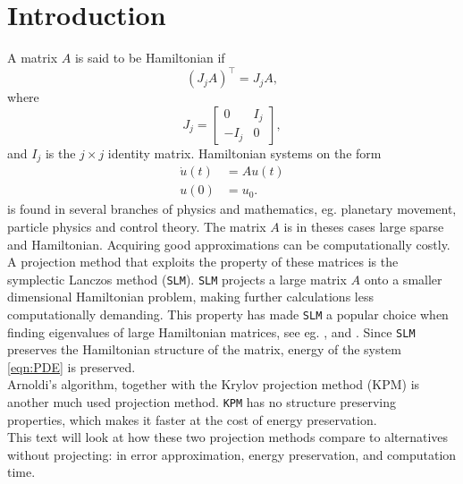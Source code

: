 \chapter{Introduction} %
A matrix $A$ is said to be Hamiltonian if  \cite{Hamiltonian}
\begin{equation*}
(J_jA)^{\top} = J_j A,
\end{equation*}
where
\begin{equation*}
J_j = 
\begin{bmatrix}
0&I_j\\-I_j&0
\end{bmatrix},
\end{equation*}
and $I_j$ is the $j \times j$ identity matrix.
Hamiltonian systems on the form 
\begin{equation} 
\begin{aligned}
\dot{u}(t) &= A u(t)\\
u(0)&= u_0.
\end{aligned}
\label{eqn:PDE}
\end{equation} is found in several branches of physics and mathematics, eg. planetary movement, particle physics and control theory.
The matrix $A$ is in theses cases large sparse and Hamiltonian. Acquiring good approximations can be computationally costly. A projection method that exploits the property of these matrices is the symplectic Lanczos method (\texttt{SLM}). \texttt{SLM} projects a large matrix $A$ onto a smaller dimensional Hamiltonian problem, making further calculations less computationally demanding. This property has made \texttt{SLM} a popular choice when finding eigenvalues of large Hamiltonian matrices, see eg. \citep{SLM1}, \citep{SLM2} and \citep{SLM3}. Since \texttt{SLM} preserves the Hamiltonian structure of the matrix, energy of the system \eqref{eqn:PDE} is preserved.\\
Arnoldi's algorithm, together with the Krylov projection method (KPM) is another much used projection method. \texttt{KPM} has no structure preserving properties, which makes it faster at the cost of energy preservation. \\
This text will look at how these two projection methods compare to alternatives without projecting: in error approximation, energy preservation, and computation time. \\
